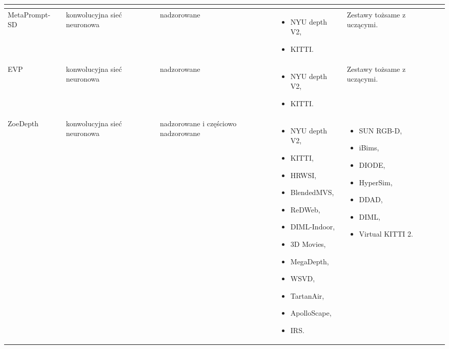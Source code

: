 \begin{table}[H]
{\begin{tabular}{ |l|p{2cm}|p{2cm}|p{5cm}|p{5cm}|r| }
\begin{itemize}
        \end{itemize}\\
        \hline
        MetaPrompt-SD &
        konwolucyjna sieć neuronowa &
        nadzorowane &
        \begin{itemize} 
            \item NYU depth V2,
            \item KITTI.
        \end{itemize} & 
        Zestawy tożsame z uczącymi.\\
        \hline
        EVP &
        konwolucyjna sieć neuronowa &
        nadzorowane &
        \begin{itemize} 
            \item NYU depth V2,
            \item KITTI.
        \end{itemize} & 
        Zestawy tożsame z uczącymi.\\
        \hline
        ZoeDepth &
        konwolucyjna sieć neuronowa &
        nadzorowane i częściowo nadzorowane &
        \begin{itemize} 
            \item NYU depth V2,
            \item KITTI,
            \item HRWSI,
            \item BlendedMVS,
            \item ReDWeb,
            \item DIML-Indoor,
            \item 3D Movies,
            \item MegaDepth,
            \item WSVD,
            \item TartanAir,
            \item ApolloScape,
            \item IRS.
        \end{itemize} & 
        \begin{itemize} 
            \item SUN RGB-D,
            \item iBims,
            \item DIODE,
            \item HyperSim,
            \item DDAD,
            \item DIML,
            \item Virtual KITTI 2.
        \end{itemize}\\

\end{tabular}}
\end{table}
